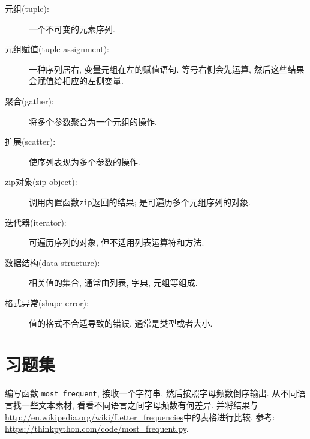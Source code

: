 \documentclass[10pt]{book}
\begin{document}
\begin{description}

\item[元组(tuple):] 一个不可变的元素序列. 

\item[元组赋值(tuple assignment):] 一种序列居右, 变量元组在左的赋值语句. 
等号右侧会先运算, 然后这些结果会赋值给相应的左侧变量. 

\item[聚合(gather):] 将多个参数聚合为一个元组的操作.

\item[扩展(scatter):] 使序列表现为多个参数的操作. 

\item[zip对象(zip object):] 调用内置函数{\tt zip}返回的结果;
是可遍历多个元组序列的对象. 

\item[迭代器(iterator):] 可遍历序列的对象, 但不适用列表运算符和方法. 

\item[数据结构(data structure):] 相关值的集合, 通常由列表, 字典, 元组等组成. 

\item[格式异常(shape error):] 值的格式不合适导致的错误, 通常是类型或者大小. 

\end{description}


\section{习题集}

\begin{exercise}

编写函数 \verb"most_frequent", 接收一个字符串, 然后按照字母频数倒序输出. 
从不同语言找一些文本素材, 看看不同语言之间字母频数有何差异. 
并将结果与\url{http://en.wikipedia.org/wiki/Letter_frequencies}中的表格进行比较. 
参考:
\url{https://thinkpython.com/code/most_frequent.py}.  

\end{exercise}
\end{document}
